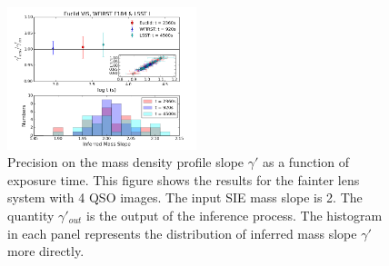 \documentclass[a4paper,11pt]{article}
\begin{document}
\begin{figure}
\begin{center}
\includegraphics[width=0.49\textwidth]{figures/gamma_hist_135949_4QSO_EWL.png}
\end{center}
\caption{Precision on the mass density profile slope $\gamma'$ as a function of exposure time.  This figure shows the results for the fainter lens system with 4 QSO images. The input SIE mass slope is 2. The quantity $\gamma'_{out}$ is the output of the inference process.
The histogram in each panel represents the distribution of inferred
mass slope $\gamma'$ more directly.}
\label{fig:gamma_fainter_4QSOimages}
\end{figure}
\end{document}
